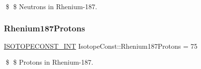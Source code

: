 \$ \$ Neutrons in Rhenium-\/187. \mbox{\label{group___isotope_const-_rhenium-_re187_gaab7d21d04afeedcd61701ce53f0f5e7a}} 
\subsubsection{\texorpdfstring{Rhenium187\+Protons}{Rhenium187Protons}}
{\footnotesize\ttfamily \mbox{\hyperlink{group___isotope_const-_macros_ga5f18360b3e99483a35c32d789e62621c}{I\+S\+O\+T\+O\+P\+E\+C\+O\+N\+S\+T\+\_\+\+I\+NT}} Isotope\+Const\+::\+Rhenium187\+Protons = 75}

\$ \$ Protons in Rhenium-\/187. 